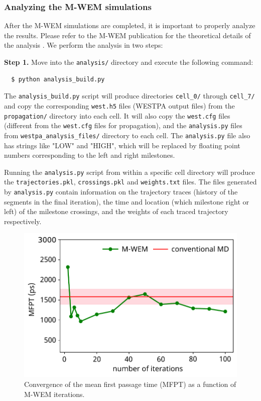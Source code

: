 \subsubsection{Analyzing the M-WEM simulations} After the M-WEM simulations are completed, it is important to properly analyze the results. 
Please refer to the M-WEM publication for the theoretical details of the analysis \cite{Ray2022Markovian}. 
We perform the analysis in two steps:

\textbf{Step 1.} Move into the \verb|analysis/| directory and execute the following command: 

\begin{verbatim}
  $ python analysis_build.py 
\end{verbatim}

The \verb|analysis_build.py| script will produce directories \verb|cell_0/| through \verb|cell_7/| and copy the corresponding \verb|west.h5| files (WESTPA output files) from the \verb|propagation/| directory into each cell. 
It will also copy the \verb|west.cfg| files (different from the \verb|west.cfg| files for propagation), and the \verb|analysis.py| files from \verb|westpa_analysis_files/| directory to each cell. 
The \verb|analysis.py| file also has strings like "LOW" and "HIGH", which will be replaced by floating point numbers corresponding to the left and right milestones.

Running the \verb|analysis.py| script from within a specific cell directory will produce the \verb|trajectories.pkl|, \verb|crossings.pkl| and \verb|weights.txt| files. 
The files generated by \verb|analysis.py| contain information on the trajectory traces (history of the segments in the final iteration), the time and location (which milestone right or left) of the milestone crossings, and the weights of each traced trajectory respectively.

\begin{figure}[t]
\centering
\includegraphics[width=\columnwidth]{figures/Figure10_MFPT.pdf}
\caption{Convergence of the mean first passage time (MFPT) as a function of M-WEM iterations.}
\end{figure}

